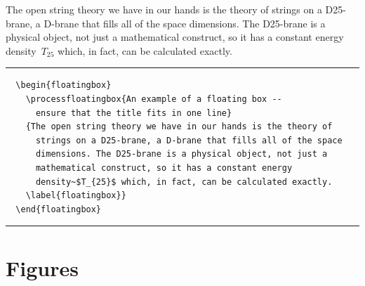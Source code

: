   \begin{floatingbox}
    {The open string theory we have in our hands is the theory of
      strings on a D25-brane, a D-brane that fills all of the space
      dimensions. The D25-brane is a physical object, not just a
      mathematical construct, so it has a constant energy
      density~$T_{25}$ which, in fact, can be calculated exactly.
    \label{floatingbox}}
  \rule[-20pt]{\textwidth}{0.5pt}
\begin{verbatim}
  \begin{floatingbox}
    \processfloatingbox{An example of a floating box --
      ensure that the title fits in one line}
    {The open string theory we have in our hands is the theory of
      strings on a D25-brane, a D-brane that fills all of the space
      dimensions. The D25-brane is a physical object, not just a
      mathematical construct, so it has a constant energy
      density~$T_{25}$ which, in fact, can be calculated exactly.
    \label{floatingbox}}
  \end{floatingbox}
\end{verbatim}
  \rule[20pt]{\textwidth}{0.5pt}
  \end{floatingbox}


\section{Figures}

